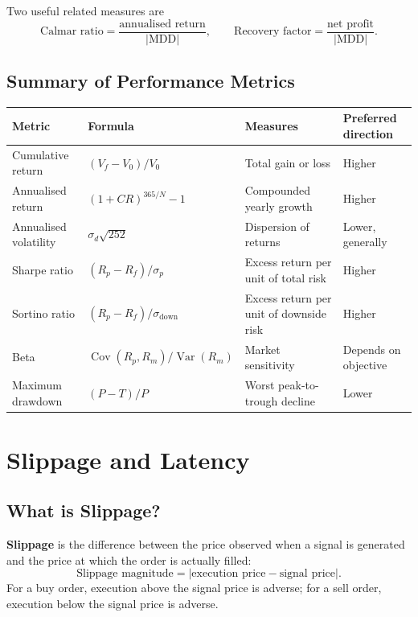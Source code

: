 \documentclass[12pt,openany]{book}
\theoremstyle{definition}
\theoremstyle{remark}
\begin{document}
Two useful related measures are
\[
\text{Calmar ratio}
  =\frac{\text{annualised return}}{|\text{MDD}|},
\qquad
\text{Recovery factor}
  =\frac{\text{net profit}}{|\text{MDD}|}.
\]

\subsection{Summary of Performance Metrics}

\begin{center}
\footnotesize
\renewcommand{\arraystretch}{1.18}
\begin{tabular}{|L{0.15\textwidth}|L{0.23\textwidth}|L{0.21\textwidth}|L{0.15\textwidth}|}
\hline
\textbf{Metric} & \textbf{Formula} & \textbf{Measures} & \textbf{Preferred direction} \\ \hline
Cumulative return & \((V_f-V_0)/V_0\) & Total gain or loss & Higher \\ \hline
Annualised return & \((1+CR)^{365/N}-1\) & Compounded yearly growth & Higher \\ \hline
Annualised volatility & \(\sigma_d\sqrt{252}\) & Dispersion of returns & Lower, generally \\ \hline
Sharpe ratio & \((R_p-R_f)/\sigma_p\) & Excess return per unit of total risk & Higher \\ \hline
Sortino ratio & \((R_p-R_f)/\sigma_{\mathrm{down}}\) & Excess return per unit of downside risk & Higher \\ \hline
Beta & \(\operatorname{Cov}(R_p,R_m)/\operatorname{Var}(R_m)\) & Market sensitivity & Depends on objective \\ \hline
Maximum drawdown & \((P-T)/P\) & Worst peak-to-trough decline & Lower \\ \hline
\end{tabular}
\end{center}


\section{Slippage and Latency}

\subsection{What is Slippage?}

\textbf{Slippage} is the difference between the price observed when a signal
is generated and the price at which the order is actually filled:
\[
\text{Slippage magnitude}
 =\left|\text{execution price}-\text{signal price}\right|.
\]
For a buy order, execution above the signal price is adverse; for a sell
order, execution below the signal price is adverse.
\end{document}
